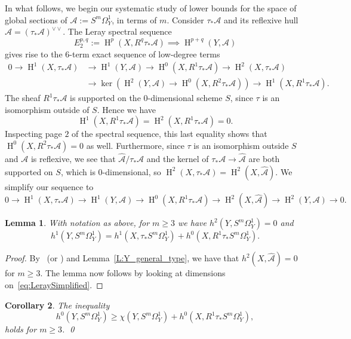 \documentclass[12pt, reqno]{amsart}
\newtheorem{lemma}{Lemma}[section]
\newtheorem{cor}[lemma]{Corollary}
\theoremstyle{definition}
\newcommand{\calA}{{\mathcal A}}
\DeclareMathOperator{\HH}{H}
\numberwithin{equation}{section}
\numberwithin{table}{section}
\begin{document}
In what follows, we begin our systematic study of lower bounds for the space of global sections of $\calA := S^m\Omega_Y^1$, in terms of $m$. Consider $\tau_*\calA$ and its reflexive hull $\hat{\calA}=(\tau_*\calA)^{\vee\vee}$. The Leray spectral sequence
\[
E_2^{p,q} := \HH^p(X,R^q\tau_*\calA) \implies \HH^{p+q}(Y,\calA)
\]
gives rise to the $6$-term exact sequence of low-degree terms
\[
\begin{split}
0\to \HH^1(X,\tau_*\calA) &\to \HH^1(Y,\calA)\to \HH^0(X,R^1\tau_*\calA)\to \HH^2(X,\tau_*\calA)\\
&\to \ker\left(\HH^2(Y,\calA)\to \HH^0(X,R^2\tau_*\calA)\right) \to \HH^1(X,R^1\tau_*\calA).
\end{split}
\]
The sheaf $R^1\tau_*\calA$ is supported on the $0$-dimensional scheme $S$, since $\tau$ is an isomorphism outside of $S$. Hence we have 
\[
\HH^1(X,R^1\tau_*\calA) = \HH^2(X,R^1\tau_*\calA) = 0.
\]
Inspecting page $2$ of the spectral sequence, this last equality shows that $\HH^0(X,R^2\tau_*\calA) = 0$ as well. Furthermore, since $\tau$ is an isomorphism outside $S$ and $\calA$ is reflexive, we see that $\hat{\calA}/\tau_*\calA$ and the kernel of $\tau_*\calA\to\hat\calA$ are both supported on $S$, which is $0$-dimensional, so $\HH^2(X,\tau_*\calA)=\HH^2(X,\hat\calA)$. We simplify our sequence to
\begin{equation}
\label{eq:LeraySimplified}
0\to \HH^1(X,\tau_*\calA) \to \HH^1(Y,\calA)\to \HH^0(X,R^1\tau_*\calA)\to \HH^2(X,\hat{\calA}) \to \HH^2(Y,\calA)\to 0.
\end{equation}

\begin{lemma}
\label{lem:Leray}
With notation as above, for $m\geq 3$ we have $h^2(Y,S^m\Omega_Y^1) = 0$ and
\[
h^1(Y,S^m\Omega_Y^1) = h^1(X,\tau_*S^m\Omega^1_Y)+h^0(X,R^1\tau_*S^m\Omega^1_Y).
\]
\end{lemma}

\begin{proof}
By~\cite[Proposition~2.3]{BO} (or \cite[Lemme~3.3.2]{Deschamps}) and Lemma~\ref{L:Y_general_type}, we have that $h^2(X,\hat\calA) = 0$ for $m\geq 3$. The lemma now follows by looking at dimensions on~\eqref{eq:LeraySimplified}.
\end{proof}

\begin{cor}
\label{cor:MainLowerBound}
The inequality 
\[
h^0(Y,S^m\Omega_Y^1) \geq \chi(Y,S^m\Omega^1_Y) + h^0(X,R^1\tau_*S^m\Omega^1_Y),
\]
holds for $m\geq 3$. 
\qed
\end{cor}
\end{document}
